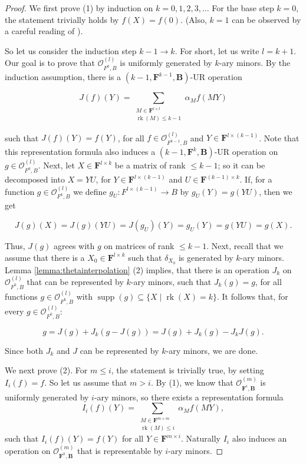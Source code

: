 \documentclass[11pt]{amsart}
\theoremstyle{plain}
\theoremstyle{definition}
\newcommand{\F}{{\mathbf F}}
\newcommand{\alg}[1]{\mathbf{#1}}
\newcommand{\clonoid}[1]{\mathcal{#1}}
\newcommand{\clodO}{\clonoid{O}}
\newcommand{\algB}{\alg{B}}
\DeclareMathOperator{\rk}{rk}
\DeclareMathOperator{\supp}{supp}
\begin{document}
\begin{proof}
We first prove (1) by induction on $k=0,1,2,3,\ldots$ For the base step $k=0$, the statement trivially holds by $f(X) = f(0)$. (Also, $k=1$ can be observed by a careful reading of \cite{fioravanti-clonoids}).

So let us consider the induction step $k-1\to k$. For short, let us write $l = k+1$. Our goal is to prove that $\clodO_{F^{k},B}^{(l)}$ is uniformly generated by $k$-ary minors. By the induction assumption, there is a $(k-1,\F^{k-1},\algB)$-UR operation 

\[J(f)(Y) = \sum_{\substack{M \in \F^{l\times l} \\
\rk(M) \leq k-1}} \alpha_M f(MY) \]

such that $J(f)(Y) = f(Y)$, for all $f\in \clodO_{F^{k-1},B}^{(l)}$ and $Y \in \F^{l\times(k-1)}$. Note that this representation formula also induces a $(k-1,\F^{k},\algB)$-UR operation on $g \in \clodO_{F^k,B}^{(l)}$. Next, let $X \in \F^{l \times k}$ be a matrix of rank $\leq k-1$; so it can be decomposed into $X = YU$, for $Y\in \F^{l \times (k-1)}$ and $U\in \F^{(k-1) \times k}$. If, for a function $g \in \clodO_{F^k,B}^{(l)}$ we define $g_U \colon F^{l \times (k-1)} \rightarrow B$ by $g_U(Y) = g(YU)$, then we get 

$$J(g)(X) =  J(g)(YU) = J(g_U)(Y) = g_U(Y) = g(YU) = g(X).$$

Thus, $J(g)$ agrees with $g$ on matrices of rank $\leq k-1$. Next, recall that we assume that there is a $X_0 \in \F^{l\times k}$ such that $\delta_{X_0}$ is generated by $k$-ary minors. Lemma \ref{lemma:thetainterpolation} (2) implies, that there is an operation $J_k$ on $\clodO_{F^k,B}^{(l)}$ that can be represented by $k$-ary minors, such that $J_k(g) = g$, for all functions $g \in \clodO_{F^k,B}^{(l)}$ with $\supp(g) \subseteq \{X \mid \rk(X) = k\}$. It follows that, for every $g \in \clodO_{F^k,B}^{(l)}$:

$$g = J(g) + J_k(g-J(g)) = J(g) + J_k(g) - J_kJ(g).$$

Since both $J_k$ and $J$ can be represented by $k$-ary minors, we are done.

We next prove (2). For $m \leq i$, the statement is trivially true, by setting $I_i(f) = f$. So let us assume that $m>i$. By (1), we know that $\clodO_{\F^i,\algB}^{(m)}$ is uniformly generated by $i$-ary minors, so there exists a representation formula 
\[I_i(f)(Y) = \sum_{\substack{M \in \F^{m \times m} \\
\rk(M) \leq i}} \alpha_M f(MY), \]
such that $I_i(f)(Y) = f(Y)$ for all $Y \in \F^{m \times i}$. Naturally $I_i$ also induces an operation on $\clodO_{\F^k,\algB}^{(m)}$ that is representable by $i$-ary minors.


\end{proof}
\end{document}
